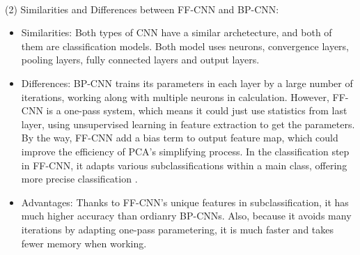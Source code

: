\documentclass[12pt]{article}
\begin{document}
	\\
	(2) Similarities and Differences between FF-CNN and BP-CNN:\\
	\begin{itemize}
		\item Similarities: Both types of CNN have a similar archetecture, and both of them are classification models. Both model uses neurons, convergence layers, pooling layers, fully connected layers and output layers. 
		
		\item Differences: BP-CNN trains its parameters in each layer by a large number of iterations, working along with multiple neurons in calculation. However, FF-CNN is a one-pass system, which means it could just use statistics from last layer, using unsupervised learning in feature extraction to get the parameters. By the way, FF-CNN add a bias term to output feature map, which could improve the efficiency of PCA's simplifying process. In the classification step in FF-CNN, it adapts various subclassifications within a main class, offering more precise classification .
		
		\item Advantages: Thanks to FF-CNN's unique features in subclassification, it has much higher accuracy than ordianry BP-CNNs. Also, because it avoids many iterations by adapting one-pass parametering, it is much faster and takes fewer memory when working. 
				

	\end{itemize}
\end{document}
